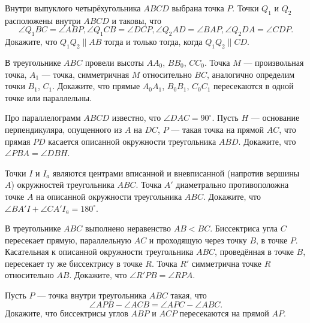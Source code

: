 \documentclass{article}
\begin{document}
\begin{enumerate_boxed}
        \item Внутри выпуклого четырёхугольника $ABCD$ выбрана точка $P$.
        Точки $Q_1$ и $Q_2$ расположены внутри $ABCD$ и таковы, что
        \[\angle Q_{1}BC=\angle ABP, \angle Q_{1}CB=\angle DCP, \angle Q_{2}AD=\angle BAP, \angle Q_{2}DA=\angle CDP.\] Докажите, что $Q_{1}Q_2\parallel AB$ тогда и только тогда, когда $Q_{1}Q_2\parallel CD$.

        \item В треугольнике $ABC$ провели высоты $AA_0$, $BB_0$, $CC_0$.
        Точка $M$ — произвольная точка, $A_1$ — точка, симметричная $M$ относительно $BC$, аналогично определим точки $B_1$, $C_1$.
        Докажите, что прямые $A_{0}A_1$, $B_{0}B_1$, $C_{0}C_1$ пересекаются в одной точке или параллельны.

        \item Про параллелограмм \(ABCD\) известно, что \(\angle DAC=90^\circ\).
        Пусть \(H\) — основание перпендикуляра, опущенного из \(A\) на \(DC\), \(P\) — такая точка на прямой \(AC\), что прямая \(PD\) касается описанной окружности треугольника \(ABD\).
        Докажите, что \(\angle PBA=\angle DBH\).

        \item Точки \(I\) и \(I_a\) являются центрами вписанной и вневписанной (напротив вершины \(A\)) окружностей треугольника \(ABC\).
        Точка \(A'\) диаметрально противоположна точке \(A\) на описанной окружности треугольника \(ABC\).
        Докажите, что \(\angle BA'I+\angle CA'I_a=180^\circ\).

        \item В треугольнике \(ABC\) выполнено неравенство \(AB<BC\).
        Биссектриса угла \(C\) пересекает прямую, параллельную \(AC\) и проходящую через точку \(B\), в точке \(P\).
        Касательная к описанной окружности треугольника \(ABC\), проведённая в точке \(B\), пересекает ту же биссектрису в точке \(R\).
        Точка \(R'\) симметрична точке \(R\) относительно \(AB\).
        Докажите, что \(\angle R'PB=\angle RPA\).

        \item Пусть \(P\) — точка внутри треугольника \(ABC\) такая, что
        \[\angle APB-\angle ACB=\angle APC-\angle ABC.\]
        Докажите, что биссектрисы углов \(ABP\) и \(ACP\) пересекаются на прямой \(AP\).

    \end{enumerate_boxed}
\end{document}
